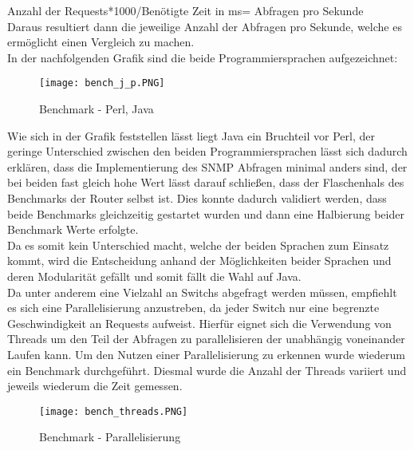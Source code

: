 Anzahl der Requests*1000/Benötigte Zeit in ms= Abfragen pro Sekunde\\

Daraus resultiert dann die jeweilige Anzahl der Abfragen pro Sekunde, welche es ermöglicht einen Vergleich zu machen.\\

In der nachfolgenden Grafik sind die beide Programmiersprachen aufgezeichnet:\\

\begin{figure}[H]
\centering
\texttt{[image: bench\_j\_p.PNG]}
\caption{Benchmark - Perl, Java}
\label{fig:benchperljava}
\end{figure}

Wie sich in der Grafik feststellen lässt liegt Java ein Bruchteil vor Perl, der geringe Unterschied zwischen den beiden Programmiersprachen lässt sich dadurch erklären, dass die Implementierung des SNMP Abfragen minimal anders sind, der bei beiden fast gleich hohe Wert lässt darauf schließen, dass der Flaschenhals des Benchmarks der Router selbst ist. Dies konnte dadurch validiert werden, dass beide Benchmarks  gleichzeitig gestartet wurden und dann eine Halbierung beider Benchmark Werte erfolgte.\\
Da es somit kein Unterschied macht, welche der beiden Sprachen zum Einsatz kommt, wird die Entscheidung anhand der Möglichkeiten beider Sprachen und deren Modularität gefällt und somit fällt die Wahl auf Java.\\

Da unter anderem eine Vielzahl an Switchs abgefragt werden müssen, empfiehlt es sich eine Parallelisierung anzustreben, da jeder Switch nur eine begrenzte Geschwindigkeit an Requests aufweist. Hierfür eignet sich die Verwendung von Threads um den Teil der Abfragen zu parallelisieren der unabhängig voneinander Laufen kann. Um den Nutzen einer Parallelisierung zu erkennen wurde wiederum ein Benchmark durchgeführt. Diesmal wurde die Anzahl der Threads variiert und jeweils wiederum die Zeit gemessen.\\

\begin{figure}[H]
\centering
\texttt{[image: bench\_threads.PNG]}
\caption{Benchmark - Parallelisierung}
\label{fig:benchparallel}
\end{figure}

